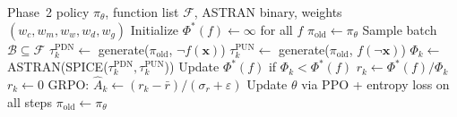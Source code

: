 \documentclass[letterpaper]{article}
\theoremstyle{plain}
\theoremstyle{definition}
\newcommand{\method}{TransSGPN}
\begin{document}
\begin{algorithm}[t]
\caption{\method{} Phase~3: Physical-Aware Joint PDN+PUN RL}
\label{alg:physical}
\begin{algorithmic}[1]
\Require Phase~2 policy $\pi_\theta$, function list $\mathcal{F}$,
         ASTRAN binary, weights $(w_c, w_m, w_w, w_d, w_g)$
\State Initialize $\Phi^*(f) \leftarrow \infty$ for all $f$
\State $\pi_{\mathrm{old}} \leftarrow \pi_\theta$
  \State Sample batch $\mathcal{B} \subseteq \mathcal{F}$
      \State $\tau_k^{\mathrm{PDN}} \leftarrow$ generate($\pi_{\mathrm{old}}$, $\lnot f(\mathbf{x})$)
      \State $\tau_k^{\mathrm{PUN}} \leftarrow$ generate($\pi_{\mathrm{old}}$, $f(\lnot\mathbf{x})$)
        \State $\Phi_k \leftarrow$ ASTRAN(SPICE($\tau_k^{\mathrm{PDN}}, \tau_k^{\mathrm{PUN}}$))
        \State Update $\Phi^*(f)$ if $\Phi_k < \Phi^*(f)$
        \State $r_k \leftarrow \Phi^*(f) / \Phi_k$
      \Else\ $r_k \leftarrow 0$
      \EndIf
    \EndFor
    \State GRPO: $\hat{A}_k \leftarrow (r_k - \bar{r}) / (\sigma_r + \varepsilon)$
  \EndFor
  \State Update $\theta$ via PPO + entropy loss on all steps
   $\pi_{\mathrm{old}} \leftarrow \pi_\theta$ \EndIf
\EndFor
\end{algorithmic}
\end{algorithm}
\end{document}
